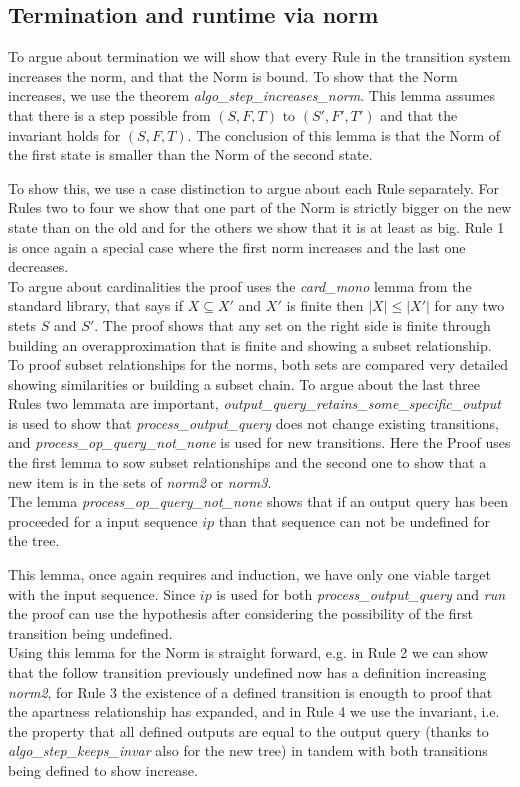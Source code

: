  \subsection{Termination and runtime via norm}
To argue about termination we will show that every Rule in the transition system increases the norm, and that the Norm is bound. To show that the Norm increases, we use the theorem \textit{algo\_step\_increases\_norm}. This lemma assumes that there is a step possible from $(S,F,T)$ to $(S',F',T')$ and that the invariant holds for $(S,F,T)$. The conclusion of this lemma is that the Norm of the first state is smaller than the Norm of the second state. 
\begin{myisabelle}
	\increasesnorm
\end{myisabelle}
To show this, we use a case distinction to argue about each Rule separately. For Rules two to four we show that one part of the Norm is strictly bigger on the new state than on the old and for the others we show that it is at least as big. Rule 1 is once again a special case where the first norm increases and the last one decreases. \\
To argue about cardinalities the proof uses the \textit{card\_mono} lemma from the standard library, that says if $X\subseteq X'$ and $X'$ is finite then $|X|\leq |X'|$ for any two stets $S$ and $S'$. The proof shows that any set on the right side is finite through building an overapproximation that is finite and showing a subset relationship. To proof subset relationships for the norms, both sets are compared very detailed showing similarities or building a subset chain. To argue about the last three Rules two lemmata are important, \textit{output\_query\_retains\_some\_specific\_output} is used to show that \textit{process\_output\_query} does not change existing transitions, and \textit{process\_op\_query\_not\_none} is used for new transitions. Here the Proof uses the first lemma to sow subset relationships and the second one to show that a new item is in the sets of \textit{norm2} or \textit{norm3}. \\
The lemma \textit{process\_op\_query\_not\_none} shows that if an output query has been proceeded for a input sequence $ip$ than that sequence can not be undefined for the tree.
\begin{myisabelle}
	\notnone
\end{myisabelle}
This lemma, once again requires and induction, we have only one viable target with the input sequence. Since $ip$ is used for both \textit{process\_output\_query} and \textit{run} the proof can use the hypothesis after considering the possibility of the first transition being undefined.\\
Using this lemma for the Norm is straight forward, e.g. in Rule 2 we can show that the follow transition previously undefined now has a definition increasing \textit{norm2}, for Rule 3 the existence of a defined transition is enougth to proof that the apartness relationship has expanded, and in Rule 4 we use the invariant, i.e. the property that all defined outputs are equal to the output query (thanks to \textit{algo\_step\_keeps\_invar} also for the new tree) in tandem with both transitions being defined to show increase.

